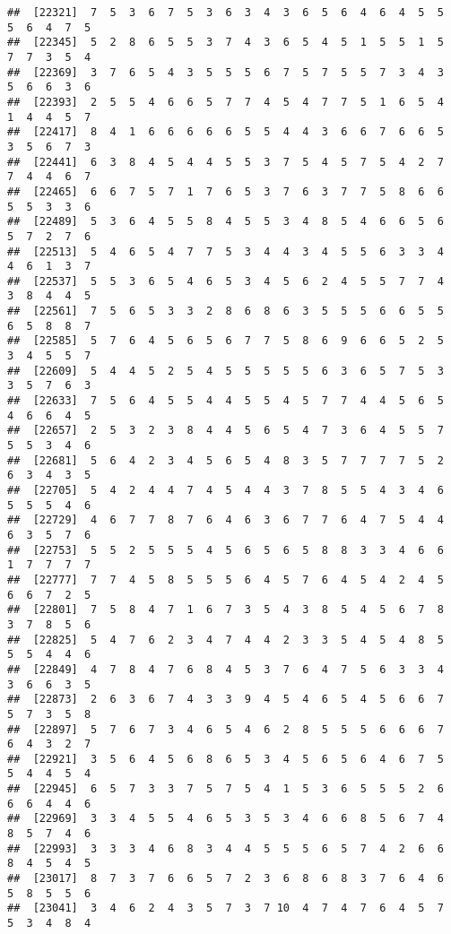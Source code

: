 \documentclass[
]{book}
\begin{document}
\begin{verbatim}
##  [22321]  7  5  3  6  7  5  3  6  3  4  3  6  5  6  4  6  4  5  5  5  6  4  7  5
##  [22345]  5  2  8  6  5  5  3  7  4  3  6  5  4  5  1  5  5  1  5  7  7  3  5  4
##  [22369]  3  7  6  5  4  3  5  5  5  6  7  5  7  5  5  7  3  4  3  5  6  6  3  6
##  [22393]  2  5  5  4  6  6  5  7  7  4  5  4  7  7  5  1  6  5  4  1  4  4  5  7
##  [22417]  8  4  1  6  6  6  6  6  5  5  4  4  3  6  6  7  6  6  5  3  5  6  7  3
##  [22441]  6  3  8  4  5  4  4  5  5  3  7  5  4  5  7  5  4  2  7  7  4  4  6  7
##  [22465]  6  6  7  5  7  1  7  6  5  3  7  6  3  7  7  5  8  6  6  5  5  3  3  6
##  [22489]  5  3  6  4  5  5  8  4  5  5  3  4  8  5  4  6  6  5  6  5  7  2  7  6
##  [22513]  5  4  6  5  4  7  7  5  3  4  4  3  4  5  5  6  3  3  4  4  6  1  3  7
##  [22537]  5  5  3  6  5  4  6  5  3  4  5  6  2  4  5  5  7  7  4  3  8  4  4  5
##  [22561]  7  5  6  5  3  3  2  8  6  8  6  3  5  5  5  6  6  5  5  6  5  8  8  7
##  [22585]  5  7  6  4  5  6  5  6  7  7  5  8  6  9  6  6  5  2  5  3  4  5  5  7
##  [22609]  5  4  4  5  2  5  4  5  5  5  5  5  6  3  6  5  7  5  3  3  5  7  6  3
##  [22633]  7  5  6  4  5  5  4  4  5  5  4  5  7  7  4  4  5  6  5  4  6  6  4  5
##  [22657]  2  5  3  2  3  8  4  4  5  6  5  4  7  3  6  4  5  5  7  5  5  3  4  6
##  [22681]  5  6  4  2  3  4  5  6  5  4  8  3  5  7  7  7  7  5  2  6  3  4  3  5
##  [22705]  5  4  2  4  4  7  4  5  4  4  3  7  8  5  5  4  3  4  6  5  5  5  4  6
##  [22729]  4  6  7  7  8  7  6  4  6  3  6  7  7  6  4  7  5  4  4  6  3  5  7  6
##  [22753]  5  5  2  5  5  5  4  5  6  5  6  5  8  8  3  3  4  6  6  1  7  7  7  7
##  [22777]  7  7  4  5  8  5  5  5  6  4  5  7  6  4  5  4  2  4  5  6  6  7  2  5
##  [22801]  7  5  8  4  7  1  6  7  3  5  4  3  8  5  4  5  6  7  8  3  7  8  5  6
##  [22825]  5  4  7  6  2  3  4  7  4  4  2  3  3  5  4  5  4  8  5  5  5  4  4  6
##  [22849]  4  7  8  4  7  6  8  4  5  3  7  6  4  7  5  6  3  3  4  3  6  6  3  5
##  [22873]  2  6  3  6  7  4  3  3  9  4  5  4  6  5  4  5  6  6  7  5  7  3  5  8
##  [22897]  5  7  6  7  3  4  6  5  4  6  2  8  5  5  5  6  6  6  7  6  4  3  2  7
##  [22921]  3  5  6  4  5  6  8  6  5  3  4  5  6  5  6  4  6  7  5  5  4  4  5  4
##  [22945]  6  5  7  3  3  7  5  7  5  4  1  5  3  6  5  5  5  2  6  6  6  4  4  6
##  [22969]  3  3  4  5  5  4  6  5  3  5  3  4  6  6  8  5  6  7  4  8  5  7  4  6
##  [22993]  3  3  3  4  6  8  3  4  4  5  5  5  6  5  7  4  2  6  6  8  4  5  4  5
##  [23017]  8  7  3  7  6  6  5  7  2  3  6  8  6  8  3  7  6  4  6  5  8  5  5  6
##  [23041]  3  4  6  2  4  3  5  7  3  7 10  4  7  4  7  6  4  5  7  5  3  4  8  4

\end{verbatim}
\end{document}
